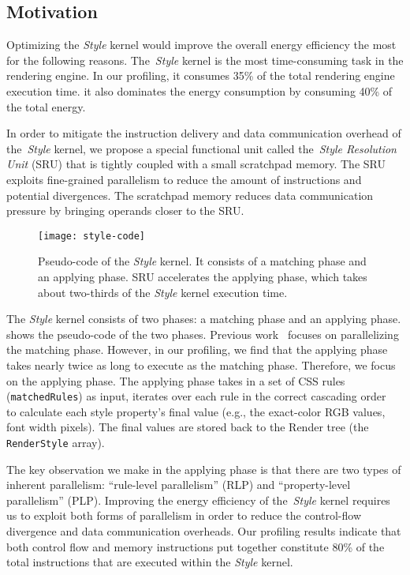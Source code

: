 \subsection{Motivation}
\label{sec:sru:motivation}

Optimizing the \textit{Style} kernel would improve the overall energy efficiency the most for the following reasons. The~\textit{Style} kernel is the most time-consuming task in the rendering engine. In our profiling, it consumes 35\% of the total rendering engine execution time. it also dominates the energy consumption by consuming 40\% of the total energy.

In order to mitigate the instruction delivery and data communication overhead of the~\textit{Style} kernel, we propose a special functional unit called the~\textit{Style Resolution Unit} (SRU) that is tightly coupled with a small scratchpad memory. The SRU exploits fine-grained parallelism to reduce the amount of instructions and potential divergences. The scratchpad memory reduces data communication pressure by bringing operands closer to the SRU.

\begin{figure}[t]
\centering
\captionsetup{width=\columnwidth}
\texttt{[image: style-code]}
\caption{\small{Pseudo-code of the \textit{Style} kernel. It consists of a matching phase and an applying phase. SRU accelerates the applying phase, which takes about two-thirds of the \textit{Style} kernel execution time.}}
\label{fig:style-code}
\end{figure}

The \textit{Style} kernel consists of two phases: a matching phase and an applying phase.  shows the pseudo-code of the two phases. Previous work~\cite{zoomm,ParallelBrowser} focuses on parallelizing the matching phase. However, in our profiling, we find that the applying phase takes nearly twice as long to execute as the matching phase. Therefore, we focus on the applying phase. The applying phase takes in a set of CSS rules (\texttt{matchedRules}) as input, iterates over each rule in the correct cascading order~\cite{cascading} to calculate each style property's final value (e.g., the exact-color RGB values, font width pixels). The final values are stored back to the Render tree (the \texttt{RenderStyle} array).

The key observation we make in the applying phase is that there are two types of inherent parallelism: ``rule-level parallelism'' (RLP) and ``property-level parallelism'' (PLP). Improving the energy efficiency of the~\textit{Style} kernel requires us to exploit both forms of parallelism in order to reduce the control-flow divergence and data communication overheads. Our profiling results indicate that both control flow and memory instructions put together constitute 80\% of the total instructions that are executed within the \textit{Style} kernel.

